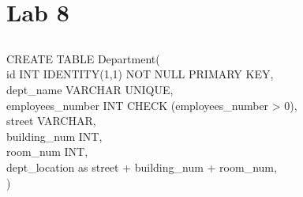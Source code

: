 \documentclass[a4paper]{article}
\begin{document}
\section{Lab 8}
\subsection{}
CREATE TABLE Department(\\
\indent id INT IDENTITY(1,1) NOT NULL PRIMARY KEY,\\
\indent dept\_name VARCHAR UNIQUE,\\
\indent employees\_number INT CHECK (employees\_number > 0),\\
\indent street VARCHAR,\\
\indent building\_num INT,\\
\indent room\_num INT,\\
\indent dept\_location as street + building\_num + room\_num,\\
)
\end{document}
